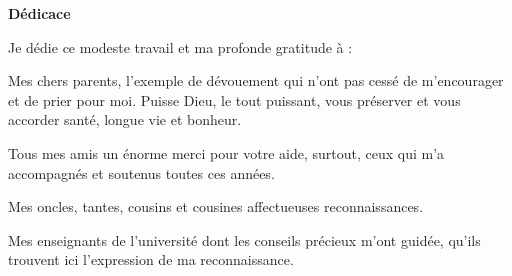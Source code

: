 








\newpage

\thispagestyle{empty}

\begin{center}
	\LARGE{\textbf{Dédicace}}
\end{center}

Je dédie ce modeste travail et ma profonde gratitude à :

Mes chers parents, l'exemple de dévouement qui n'ont pas cessé de m'encourager et de prier pour moi. Puisse Dieu, le tout puissant, vous préserver et vous accorder santé, longue vie et bonheur.

Tous mes amis un énorme merci pour votre aide, surtout, ceux qui m'a accompagnés et soutenus toutes ces années.

Mes oncles, tantes, cousins et cousines affectueuses reconnaissances. 

Mes enseignants de l'université dont les conseils précieux m'ont guidée, qu'ils trouvent ici l'expression de ma reconnaissance.



\vspace*{1cm}
            
